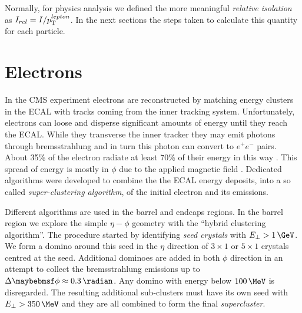 Normally, for physics analysis we defined the more meaningful \textit{relative isolation} as $I_{rel} = I/p_{\mathrm{T}}^{lepton}$. In the next sections the steps taken to calculate this quantity for each particle.

\section{Electrons}
\label{SECTION:EventReconstructionPhysicsObjects_Electrons}


In the \gls{CMS} experiment electrons are reconstructed by matching energy clusters in the \gls{ECAL} with tracks coming from the inner tracking system. Unfortunately, electrons can loose and disperse significant amounts of energy until they reach the \gls{ECAL}. While they transverse the inner tracker they may emit photons through bremsstrahlung and in turn this photon can convert to $e^+e^-$ pairs. About 35\% of the electron radiate at least 70\% of their energy in this way \cite{ARTICLE:CMSElectronReconstruction}. This spread of energy is mostly in $\phi$ due to the applied magnetic field \cite{ARTICLE:CMSElectronReconstructionECAL}. Dedicated algorithms were developed to combine the the \gls{ECAL} energy deposits, into a so called \textit{super-clustering algorithm}, of the initial electron and its emissions.

Different algorithms are used in the barrel and endcaps regions. In the barrel region we explore the simple $\eta-\phi$ geometry with the ``hybrid clustering algorithm''. The procedure started by identifying \textit{seed crystals} with $E_\perp>1\,\GeV$. We form a domino around this seed in the $\eta$ direction of $3 \times 1$ or $5 \times 1$ crystals centred at the seed. Additional dominoes are added in both $\phi$ direction in an attempt to collect the bremsstrahlung emissions up to $\Delta\phi \approx 0.3\,\radian$. Any domino with energy below $100\,\MeV$ is disregarded. The resulting additional sub-clusters must have its own seed with $E_\perp>350\,\MeV$ and they are all combined to form the final \textit{supercluster}. 

